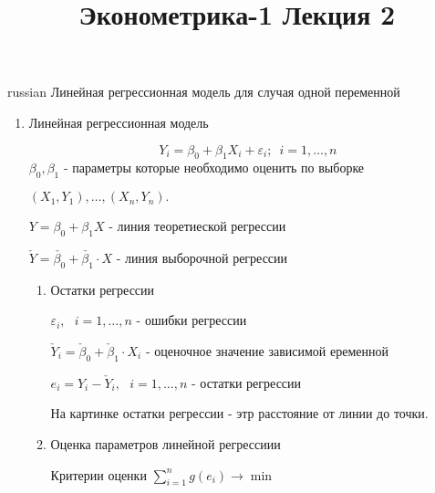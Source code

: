 \documentclass{article}
\begin{document}
\title{\foreignlanguage{russian}{Эконометрика-1 Лекция 2}}
\maketitle

\begin{otherlanguage*}{russian}
Линейная регрессионная модель для случая одной переменной
\begin{enumerate}
\item Линейная регрессионная модель 

\begin{equation}
Y_i = \beta_0 + \beta_1 X_i  + \varepsilon_i; \,\,\, i = 1, \ldots, n 
\end{equation}
$\beta_0, \beta_1$ - параметры которые необходимо оценить по выборке 

$(X_1, Y_1), \ldots, (X_n, Y_n). $

$ Y = \beta_0+ \beta_1 X $ - линия теоретиеской регрессии 

$\check{Y} = \check{\beta_0} + \check{\beta_1} \cdot X $ - линия выборочной регрессии

\begin{enumerate}
\item Остатки  регрессии

$\varepsilon_i,\,\,\,\, i = 1,\ldots, n$ - ошибки регрессии

$\check{Y}_i = \check{\beta}_0 + \check{\beta}_1 \cdot X_i$ - оценочное значение зависимой еременной

$ e_i = Y_i - \check{Y}_i, \,\,\,\, i = 1, \ldots, n $ - остатки регрессии

На картинке остатки регрессии - этр расстояние от линии до точки. 

\item Оценка параметров линейной регрессиии

Критерии оценки $ \sum_{i=1}^n g(e_i) \rightarrow \min $



\end{enumerate}
\end{enumerate}
\end{otherlanguage*}
\end{document}
